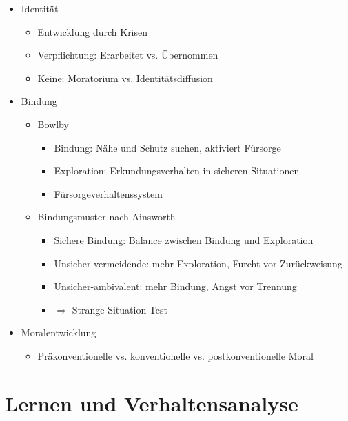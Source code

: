 \documentclass[11pt, paper=a4, twocolumn]{scrartcl}
\begin{document}
\begin{itemize}
		\item Identität
			\begin{itemize}
				\item Entwicklung durch Krisen
				\item Verpflichtung: Erarbeitet vs. 
					Übernommen
				\item Keine: Moratorium vs. 
					Identitätsdiffusion
			\end{itemize}
		
		\item Bindung
			\begin{itemize}
				\item Bowlby
					\begin{itemize}
						\item Bindung: Nähe und Schutz suchen, 
							aktiviert Fürsorge
						\item Exploration: Erkundungsverhalten in 
							sicheren Situationen
						\item Fürsorgeverhaltenssystem
					\end{itemize}
				\item Bindungsmuster nach Ainsworth
					\begin{itemize}
						\item Sichere Bindung: Balance zwischen 
							Bindung und Exploration
						\item Unsicher-vermeidende: mehr 
							Exploration, Furcht vor 
							Zurückweisung
						\item Unsicher-ambivalent: mehr Bindung, 
							Angst vor Trennung
						\item $\Rightarrow$ Strange Situation Test
					\end{itemize}
			\end{itemize}

		\item Moralentwicklung
			\begin{itemize}
				\item Präkonventionelle vs. konventionelle vs. 
					postkonventionelle Moral
			\end{itemize}
	\end{itemize}
	\section{Lernen und Verhaltensanalyse}
\end{document}
